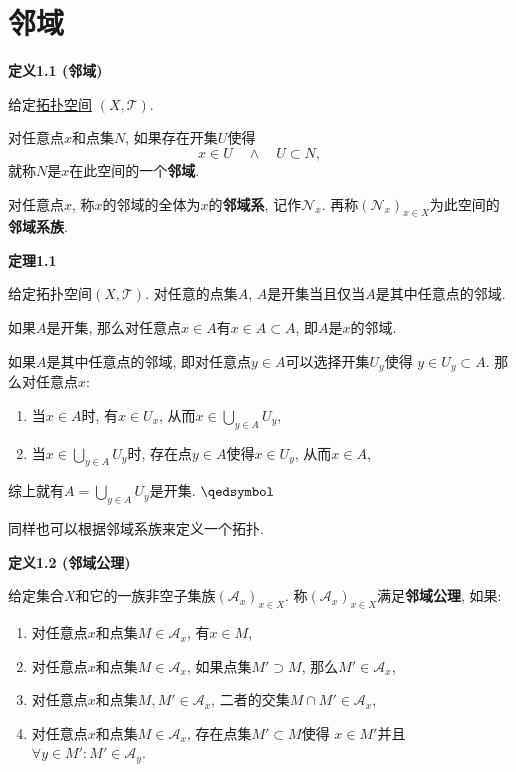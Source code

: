 \documentclass[UTF8]{ctexart}
\begin{document}
\setlength{\abovedisplayskip}{1pt}
\setlength{\belowdisplayskip}{1pt}

\section{邻域}

\hypertarget{sec:定义1.1}{}
\noindent\textbf{定义1.1 (邻域)}

给定\href{01 拓扑空间#nameddest=sec:定义1.1}{拓扑空间} $(X,\mathcal{T})$.

对任意点$x$和点集$N$,
如果存在开集$U$使得
\[
    x\in U\quad\land\quad U\subset N,
\]
就称$N$是$x$在此空间的一个\textbf{邻域}.

对任意点$x$, 称$x$的邻域的全体为$x$的\textbf{邻域系}, 记作$\mathcal{N}_x$.
再称$(\mathcal{N}_x)_{x\in X}$为此空间的\textbf{邻域系族}.

\vspace{10pt}

\hypertarget{sec:定理1.1}{}
\noindent\textbf{定理1.1}

给定拓扑空间$(X,\mathcal{T})$. 对任意的点集$A$,
$A$是开集当且仅当$A$是其中任意点的邻域.


如果$A$是开集, 那么对任意点$x\in A$有$x\in A\subset A$, 即$A$是$x$的邻域.

如果$A$是其中任意点的邻域, 即对任意点$y\in A$可以选择开集$U_y$使得
$y\in U_y\subset A$. 那么对任意点$x$:
\begin{enumerate}
    \item 当$x\in A$时, 有$x\in U_x$, 从而$\displaystyle x\in\bigcup_{y\in A}U_y$,
    \item 当$\displaystyle x\in\bigcup_{y\in A}U_y$时,
    存在点$y\in A$使得$x\in U_y$, 从而$x\in A$,
\end{enumerate}
\vspace{3pt}
综上就有$\displaystyle A=\bigcup_{y\in A}U_y$是开集. \hfill $\qedsymbol$

\vspace{10pt}

同样也可以根据邻域系族来定义一个拓扑.

\vspace{10pt}

\hypertarget{sec:定义1.2}{}
\noindent\textbf{定义1.2 (邻域公理)}

给定集合$X$和它的一族非空子集族$(\mathcal{A}_x)_{x\in X}$.
称$(\mathcal{A}_x)_{x\in X}$满足\textbf{邻域公理}, 如果:
\begin{enumerate}
    \item 对任意点$x$和点集$M\in\mathcal{A}_x$, 有$x\in M$,
    \item 对任意点$x$和点集$M\in\mathcal{A}_x$,
    如果点集$M'\supset M$, 那么$M'\in\mathcal{A}_x$,
    \item 对任意点$x$和点集$M,M'\in\mathcal{A}_x$,
    二者的交集$M\cap M'\in\mathcal{A}_x$,
    \item 对任意点$x$和点集$M\in\mathcal{A}_x$, 存在点集$M'\subset M$使得
    $x\in M'$并且$\forall y\in M':M'\in\mathcal{A}_y$.
\end{enumerate}
\end{document}
